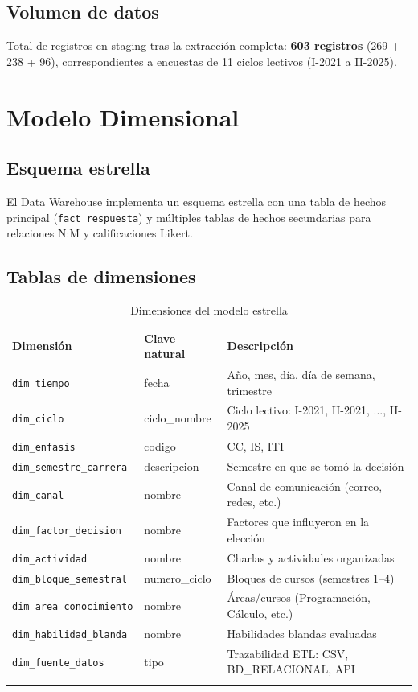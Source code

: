 \documentclass[12pt, letterpaper]{article}
\begin{document}
\subsection{Volumen de datos}

Total de registros en staging tras la extracción completa: \textbf{603 registros} (269 + 238 + 96), correspondientes a encuestas de 11 ciclos lectivos (I-2021 a II-2025).

\section{Modelo Dimensional}

\subsection{Esquema estrella}

El Data Warehouse implementa un esquema estrella con una tabla de hechos principal (\texttt{fact\_respuesta}) y múltiples tablas de hechos secundarias para relaciones N:M y calificaciones Likert.

\subsection{Tablas de dimensiones}

\begin{longtable}{llp{6cm}}
\toprule
\textbf{Dimensión} & \textbf{Clave natural} & \textbf{Descripción} \\
\midrule
\endhead
\texttt{dim\_tiempo} & fecha & Año, mes, día, día de semana, trimestre \\
\texttt{dim\_ciclo} & ciclo\_nombre & Ciclo lectivo: I-2021, II-2021, ..., II-2025 \\
\texttt{dim\_enfasis} & codigo & CC, IS, ITI \\
\texttt{dim\_semestre\_carrera} & descripcion & Semestre en que se tomó la decisión \\
\texttt{dim\_canal} & nombre & Canal de comunicación (correo, redes, etc.) \\
\texttt{dim\_factor\_decision} & nombre & Factores que influyeron en la elección \\
\texttt{dim\_actividad} & nombre & Charlas y actividades organizadas \\
\texttt{dim\_bloque\_semestral} & numero\_ciclo & Bloques de cursos (semestres 1--4) \\
\texttt{dim\_area\_conocimiento} & nombre & Áreas/cursos (Programación, Cálculo, etc.) \\
\texttt{dim\_habilidad\_blanda} & nombre & Habilidades blandas evaluadas \\
\texttt{dim\_fuente\_datos} & tipo & Trazabilidad ETL: CSV, BD\_RELACIONAL, API \\
\bottomrule
\caption{Dimensiones del modelo estrella}
\end{longtable}
\end{document}
